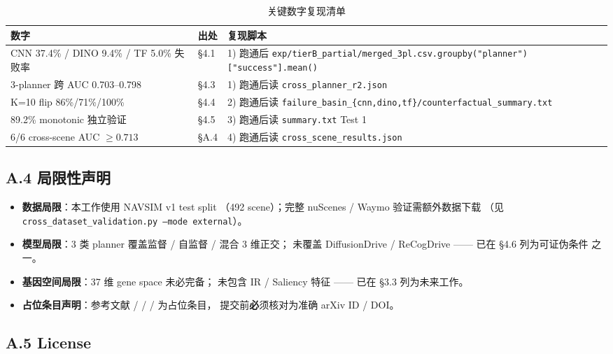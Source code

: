 \documentclass[a4paper,12pt,fontset=fandol]{ctexart}
\begin{document}
{\begin{table}[H]
\centering
\small
\caption{关键数字复现清单}
\begin{tabularx}{\linewidth}{lXl}
\toprule
\textbf{数字} & \textbf{出处} & \textbf{复现脚本} \\
\midrule
CNN 37.4\% / DINO 9.4\% / TF 5.0\% 失败率
  & §4.1 & 1) 跑通后 \texttt{exp/tierB\_partial/merged\_3pl.csv.groupby("planner")["success"].mean()} \\
3-planner 跨 AUC 0.703--0.798 & §4.3 & 1) 跑通后读 \texttt{cross\_planner\_r2.json} \\
K=10 flip 86\%/71\%/100\% & §4.4 & 2) 跑通后读 \texttt{failure\_basin\_\{cnn,dino,tf\}/counterfactual\_summary.txt} \\
89.2\% monotonic 独立验证 & §4.5 & 3) 跑通后读 \texttt{summary.txt} Test 1 \\
6/6 cross-scene AUC $\geq 0.713$ & §A.4 & 4) 跑通后读 \texttt{cross\_scene\_results.json} \\
\bottomrule
\end{tabularx}
\end{table}

\subsection*{A.4 局限性声明}

\begin{itemize}[leftmargin=*]
\item \textbf{数据局限}：本工作使用 NAVSIM v1 test split
      （492 scene）；完整 nuScenes / Waymo 验证需额外数据下载
      （见 \texttt{cross\_dataset\_validation.py --mode external}）。
\item \textbf{模型局限}：3 类 planner 覆盖监督 / 自监督 / 混合 3 维正交；
      未覆盖 DiffusionDrive / ReCogDrive —— 已在 §4.6 列为可证伪条件
      之一。
\item \textbf{基因空间局限}：37 维 gene space 未必完备；
      未包含 IR / Saliency 特征 —— 已在 §3.3 列为未来工作。
\item \textbf{占位条目声明}：参考文献 \cite{HAD2024} / \cite{ReCogDrive2024}
      / \cite{Chen2024} / \cite{GeneOH2023} 为占位条目，
      提交前\textbf{必}须核对为准确 arXiv ID / DOI。
\end{itemize}

\subsection*{A.5 License}

}
\end{document}
